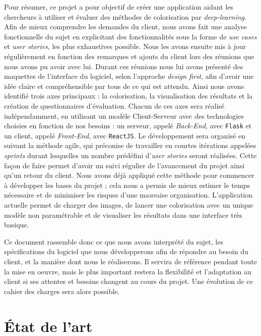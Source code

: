 \documentclass{article}
\begin{document}
Pour résumer, ce projet a pour objectif de créer une application aidant les chercheurs à utiliser et évaluer des méthodes de colorisation par \emph{deep-learning}.
Afin de mieux comprendre les demandes du client, nous avons fait une analyse fonctionnelle du sujet en explicitant des fonctionnalités sous la forme de \emph{use cases} et \emph{user stories}, les plus exhaustives possible.
Nous les avons ensuite mis à jour régulièrement en fonction des remarques et ajouts du client lors des réunions que nous avons pu avoir avec lui.
Durant ces réunions nous lui avons présenté des maquettes de l'interface du logiciel, selon l'approche \emph{design first}, afin d'avoir une idée claire et compréhensible par tous de ce qui est attendu.
Ainsi nous avons identifié trois axes principaux : la colorisation, la visualisation des résultats et la création de questionnaires d'évaluation.
Chacun de ces axes sera réalisé indépendamment, en utilisant un modèle Client-Serveur avec des technologies choisies en fonction de nos besoins : un serveur, appelé \emph{Back-End}, avec \texttt{Flask} et un client, appelé \emph{Front-End}, avec \texttt{ReactJS}.
Le développement sera organisé en suivant la méthode agile, qui préconise de travailler en courtes itérations appelées \emph{sprints} durant lesquelles un nombre prédéfini d'\emph{user stories} seront réalisées.
Cette façon de faire permet d'avoir un suivi régulier de l'avancement du projet ainsi qu'un retour du client. Nous avons déjà appliqué cette méthode pour commencer à développer les bases du projet ; cela nous a permis de mieux estimer le temps nécessaire et de minimiser les risques d'une mauvaise organisation.
L'application actuelle permet de charger des images, de lancer une colorisation avec un unique modèle non paramétrable et de visualiser les résultats dans une interface très basique.

Ce document rassemble donc ce que nous avons interprété du sujet, les spécifications du logiciel que nous développerons afin de répondre au besoin du client, et la manière dont nous le réaliserons.
Il servira de référence pendant toute la mise en oeuvre, mais le plus important restera la flexibilité et l'adaptation au client si ses attentes et besoins changent au cours du projet. Une évolution de ce cahier des charges sera alors possible.


\pagebreak
\appendix

\appendixpage
\addappheadtotoc

\section{État de l'art}
\end{document}
